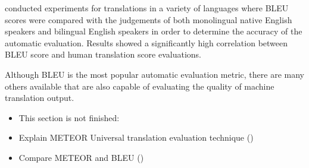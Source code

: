 \cite{papineni_bleu_2001} conducted experiments for translations in a variety of languages where \acrshort{BLEU} scores were compared with the judgements of both monolingual native English speakers and bilingual English speakers in order to determine the accuracy of the automatic evaluation. Results showed a significantly high correlation between \acrshort{BLEU} score and human translation score evaluations.





Although \acrshort{BLEU} is the most popular automatic evaluation metric, there are many others available that are also capable of evaluating the quality of machine translation output.

\begin{itemize}
    \item This section is not finished:
    \item Explain METEOR Universal translation evaluation technique (\cite{denkowski_meteor_2014})
    \item Compare METEOR and BLEU (\cite{laith_comparative_2015}) %
\end{itemize}








